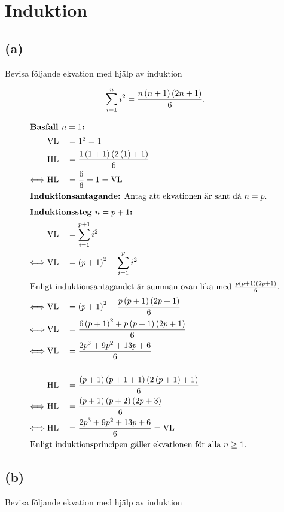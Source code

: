 \clearpage
\section*{Induktion}

\subsection*{(a)}

Bevisa följande ekvation med hjälp av induktion

\[\sum_{i=1}^{n}{i^{2}}=\frac{n\paren{n+1}\paren{2n+1}}{6}.\]

\begin{alignat*}{2}
  \intertext{
\textbf{Basfall $n=1$:}
  }
  &\VL &&= 1^{2} = 1 \\
  &\HL &&=\frac{1\paren{1+1}\paren{2\paren{1}+1}}{6} \\
  \iff&\HL &&= \frac{6}{6} = 1 = \VL \\
  \intertext{
\textbf{Induktionsantagande:} Antag att ekvationen är sant då $n=p$.
  }
  \intertext{
\textbf{Induktionssteg $n=p+1$:}
  }
  &\VL &&= \sum_{i=1}^{p+1}{i^{2}} \\
  \iff&\VL &&= \paren{p+1}^{2} + \sum_{i=1}^{p}{i^{2}} \\
  \intertext{
Enligt induktionsantagandet är summan ovan lika med
$\frac{p\paren{p+1}\paren{2p+1}}{6}$.
  }
  \iff&\VL &&= \paren{p+1}^{2} + \frac{p\paren{p+1}\paren{2p+1}}{6} \\
  \iff&\VL &&= \frac{6\paren{p+1}^{2} + p\paren{p+1}\paren{2p+1}}{6} \\
  \iff&\VL &&= \frac{2p^{3}+9p^{2}+13p+6}{6} \\
  \\
  &\HL &&=\frac{\paren{p+1}\paren{p+1+1}\paren{2\paren{p+1}+1}}{6} \\
  \iff&\HL &&=\frac{\paren{p+1}\paren{p+2}\paren{2p+3}}{6} \\
  \iff&\HL &&=\frac{2p^{3}+9p^{2}+13p+6}{6} = \VL \\
  \intertext{
Enligt induktionsprincipen gäller ekvationen för alla $n\geq1$.
  }
\end{alignat*}

\subsection*{(b)}


Bevisa följande ekvation med hjälp av induktion

